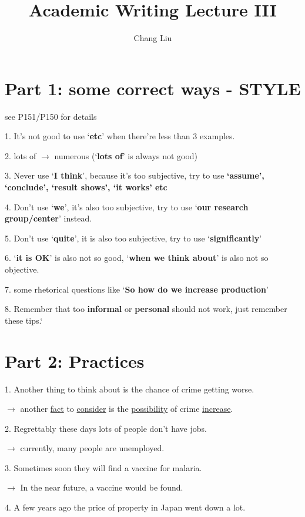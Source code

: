 \documentclass{article}
\title{Academic Writing Lecture III}
\author{Chang Liu}
\begin{document}
\maketitle

\section{Part 1: some correct ways - STYLE}

see P151/P150 for details

1. It's not good to use `\textbf{etc}' when there're less than 3 examples.

2. lots of $\rightarrow$ numerous (`\textbf{lots of}' is always not good)

3. Never use `\textbf{I think}', because it's too subjective, try to use \textbf{`assume', `conclude', `result shows', `it works' etc}

4. Don't use `\textbf{we}', it's also too subjective, try to use `\textbf{our research group/center}' instead.

5. Don't use `\textbf{quite}', it is also too subjective, try to use `\textbf{significantly}'

6. `\textbf{it is OK}' is also not so good, `\textbf{when we think about}' is also not so objective.

7. some rhetorical questions like `\textbf{So how do we increase production}'

8. Remember that too \textbf{informal} or \textbf{personal} should not work, just remember these tips.`

\section{Part 2: Practices}

1. Another thing to think about is the chance of crime getting worse.

$\rightarrow$ another \underline{fact} to \underline{consider} is the \underline{possibility} of crime \underline{increase}.

2. Regrettably these days lots of people don't have jobs.

$\rightarrow$ currently, many people are unemployed.

3. Sometimes soon they will find a vaccine for malaria.

$\rightarrow$ In the near future, a vaccine would be found.

4. A few years ago the price of property in Japan went down a lot.
\end{document}
